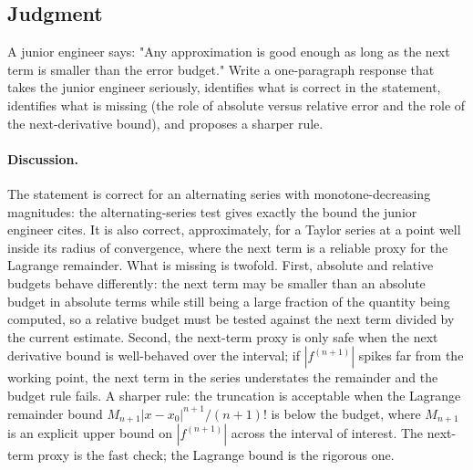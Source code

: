 \subsection*{Judgment}

\begin{exercise}
A junior engineer says: "Any approximation is good enough as long as
the next term is smaller than the error budget." Write a one-paragraph
response that takes the junior engineer seriously, identifies what is
correct in the statement, identifies what is missing (the role of
absolute versus relative error and the role of the next-derivative
bound), and proposes a sharper rule.

\paragraph{Discussion.} The statement is correct for an alternating
series with monotone-decreasing magnitudes: the alternating-series
test gives exactly the bound the junior engineer cites. It is also
correct, approximately, for a Taylor series at a point well inside
its radius of convergence, where the next term is a reliable proxy
for the Lagrange remainder. What is missing is twofold. First,
absolute and relative budgets behave differently: the next term may
be smaller than an absolute budget in absolute terms while still
being a large fraction of the quantity being computed, so a relative
budget must be tested against the next term divided by the current
estimate. Second, the next-term proxy is only safe when the next
derivative bound is well-behaved over the interval; if $|f^{(n+1)}|$
spikes far from the working point, the next term in the series
understates the remainder and the budget rule fails. A sharper rule:
the truncation is acceptable when the Lagrange remainder bound
$M_{n+1} |x - x_{0}|^{n+1}/(n+1)!$ is below the budget, where
$M_{n+1}$ is an explicit upper bound on $|f^{(n+1)}|$ across the
interval of interest. The next-term proxy is the fast check; the
Lagrange bound is the rigorous one.
\end{exercise}

